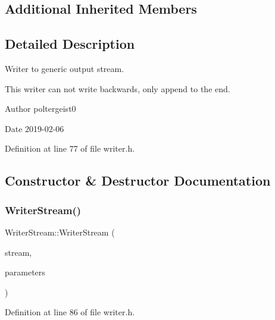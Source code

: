 \subsection*{Additional Inherited Members}


\subsection{Detailed Description}
Writer to generic output stream. 

This writer can not write backwards, only append to the end.

\begin{DoxyAuthor}{Author}
poltergeist0
\end{DoxyAuthor}
\begin{DoxyDate}{Date}
2019-\/02-\/06 
\end{DoxyDate}


Definition at line 77 of file writer.\+h.



\subsection{Constructor \& Destructor Documentation}
\mbox{\label{classWriterStream_a55d7efb73214dc0e537b7f2960920571}} 
\subsubsection{\texorpdfstring{Writer\+Stream()}{WriterStream()}}
{\footnotesize\ttfamily Writer\+Stream\+::\+Writer\+Stream (\begin{DoxyParamCaption}\item[{std\+::ostream \&}]{stream,  }\item[{const \hyperlink{structProgramParameters}{Program\+Parameters} \&}]{parameters }\end{DoxyParamCaption})\hspace{0.3cm}{\ttfamily [inline]}}



Definition at line 86 of file writer.\+h.

\mbox{\label{classWriterStream_aca4ddce14ac1b23a2f5db8cce0af4cfd}} 
